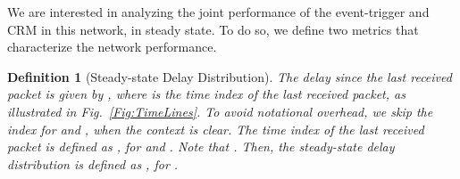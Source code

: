 \documentclass[journal]{IEEEtran}
\newtheorem{definition}{Definition}[section]
\begin{document}
We are interested in analyzing the joint performance of the event-trigger and CRM in this network, in steady state. To do so, we define two metrics that characterize the network performance.
\begin{definition}[Steady-state Delay Distribution]
The delay since the last received packet is given by , where  is the time index of the last received packet, as illustrated in Fig.~\ref{Fig:TimeLines}. To avoid notational overhead, we skip the index  for  and , when the context is clear. The time index of the last received packet is defined as , for  and . Note that . Then, the steady-state delay distribution is defined as , for .
\end{definition}
\begin{figure}[tb]
    \centering
    \def\svgwidth{9cm}
    


\end{figure}
\end{document}
